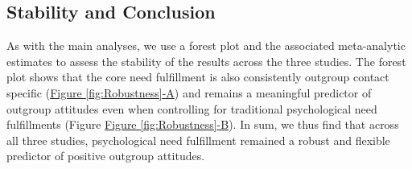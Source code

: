 \documentclass[man, 12pt, a4paper, mask]{apa7}
\theoremstyle{break}
\theoremstyle{plain}
\newcommand{\fgrref}[2][]{\hyperref[#2]{Figure \ref*{#2}#1}}
\begin{document}
\subsection{Stability and Conclusion}
As with the main analyses, we use a forest plot and the associated meta-analytic estimates to assess the stability of the results across the three studies. The forest plot shows that the core need fulfillment is also consistently outgroup contact specific (\fgrref[-A]{fig:Robustness}) and remains a meaningful predictor of outgroup attitudes even when controlling for traditional psychological need fulfillments (Figure \fgrref[-B]{fig:Robustness}). In sum, we thus find that across all three studies, psychological need fulfillment remained a robust and flexible predictor of positive outgroup attitudes.


\end{document}

